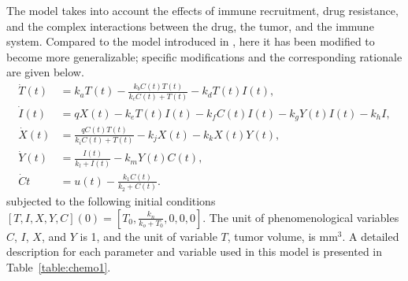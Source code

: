 The model takes into account the effects of immune recruitment, drug resistance, and the complex interactions between the drug, the tumor, and the immune system. Compared to the model introduced in \cite{tran2020delicate}, here it has been modified to become more generalizable; specific modifications and the corresponding rationale are given below.
\begin{subequations} \label{eq:chemo1}
	\begin{align} 
		\dot{T}(t) &=  k_{a} T(t) - \frac{k_{b}C(t)T(t)}{k_{c}C(t)+T(t)} - k_{d}T(t)I(t),\\
		\dot{I}(t) &= q X(t) -k_{e}T(t)I(t)-k_{f}C(t)I(t)-k_{g}Y(t)I(t)-k_{h}I,\\
		\dot{X}(t) &= \frac{q C(t)T(t)}{k_{i}C(t)+T(t)}-k_{j}X(t)-k_{k}X(t)Y(t),\\
		\dot{Y}(t) &= \frac{I(t)}{k_l+I(t)} - k_{m}Y(t) C(t),\\
		\dot{C}{t} &= u(t) - \frac{k_1 C(t)}{k_2 + C(t)}.
	\end{align}
\end{subequations}
subjected to the following initial conditions $[T,I,X,Y,C](0)=[T_0,\frac{k_n}{k_o+T_0},0,0,0]$. The unit of phenomenological variables $C$, $I$, $X$, and $Y$ is 1, and the unit of variable $T$, tumor volume, is mm$^3$. A detailed description for each parameter and variable used in this model is presented in Table~\ref{table:chemo1}.
%
